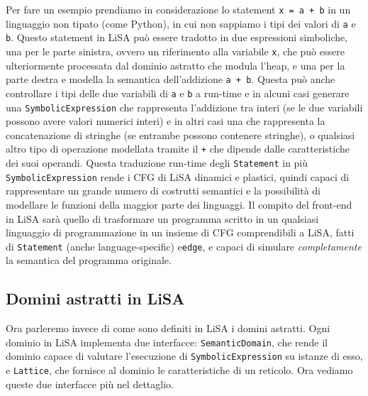 Per fare un esempio prendiamo in considerazione lo statement \texttt{x = a + b} in un linguaggio non tipato (come Python), in cui non sappiamo i tipi dei valori di \texttt{a} e \texttt{b}. Questo statement in LiSA può essere tradotto in due espressioni simboliche, una per le parte sinistra, ovvero un riferimento alla variabile \texttt{x}, che può essere ulteriormente processata dal dominio astratto che modula l'heap, e una per la parte destra e modella la semantica dell'addizione \texttt{a + b}. Questa può anche controllare i tipi delle due variabili di \texttt{a} e \texttt{b} a run-time e in alcuni casi generare una \texttt{SymbolicExpression} che rappresenta l'addizione tra interi (se le due variabili possono avere valori numerici interi) e in altri casi una che rappresenta la concatenazione di stringhe (se entrambe possono contenere stringhe), o qualsiasi altro tipo di operazione modellata tramite il \texttt{+} che dipende dalle caratteristiche dei suoi operandi.
Questa traduzione run-time degli \texttt{Statement} in più \texttt{SymbolicExpression} rende i CFG di LiSA dinamici e plastici, quindi capaci di rappresentare un grande numero di costrutti semantici e la possibilità di modellare le funzioni della maggior parte dei linguaggi. Il compito del front-end in LiSA sarà quello di trasformare un programma scritto in un qualsiasi linguaggio di programmazione in un insieme di CFG comprendibili a LiSA, fatti di \texttt{Statement} (anche language-specific) e\texttt{edge}, e capaci di simulare \textit{completamente} la semantica del programma originale.

\subsection{Domini astratti in LiSA}
Ora parleremo invece di come sono definiti in LiSA i domini astratti. Ogni dominio in LiSA implementa due interfacce: \texttt{SemanticDomain}, che rende il dominio capace di valutare l'esecuzione di \texttt{SymbolicExpression} su istanze di esso, e \texttt{Lattice}, che fornisce al dominio le caratteristiche di un reticolo. Ora vediamo queste due interfacce più nel dettaglio.

